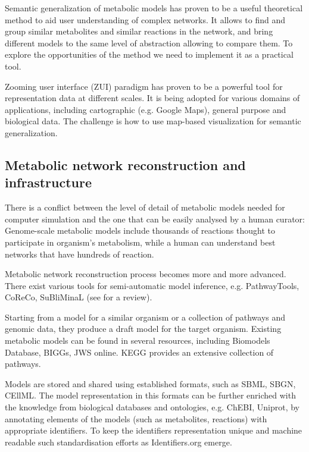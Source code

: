 \documentclass{bmcart}
\begin{document}
Semantic generalization of metabolic models\cite{Zhukova2014} has proven to be a useful theoretical method to aid user understanding of complex networks. It allows to find and group similar metabolites and similar reactions in the network, and bring different models to the same level of abstraction allowing to compare them. 
To explore the opportunities of the method we need to implement it as a practical tool.

Zooming user interface (ZUI)\cite{Bederson1998} paradigm has proven to be a powerful tool for representation data at different scales. It is being adopted for various domains of applications, including cartographic (e.g. Google Maps), general purpose and biological data. The challenge is how to use map-based visualization for semantic generalization.

\subsection*{Metabolic network reconstruction and infrastructure}
There is a conflict between the level of detail of metabolic models needed for computer simulation and the one that can be easily analysed by a human curator: Genome-scale metabolic models include thousands of reactions thought to participate in organism's metabolism, while a human can understand best networks that have hundreds of reaction.

Metabolic network reconstruction process becomes more and more advanced. There exist various tools for semi-automatic model inference, e.g. PathwayTools\cite{Karp2002}, CoReCo\cite{Pitkanen2014}, SuBliMinaL\cite{Swainston2011} (see \cite{Hamilton2014} for a review).

Starting from a model for a similar organism or a collection of pathways and genomic data, they produce a draft model for the target organism. Existing metabolic models can be found in several resources, including Biomodels Database\cite{Li10}, BIGGs\cite{Schellenberger2010}, JWS online\cite{Snoep2003}. KEGG\cite{Kanehisa12} provides an extensive collection of pathways. 

Models are stored and shared using established formats, such as SBML\cite{Hucka2003}, SBGN\cite{Moodie2011}, CEllML\cite{Lloyd2004}. The model representation in this formats can be further enriched with the knowledge from biological databases and ontologies, e.g. ChEBI\cite{deMatos10}, Uniprot\cite{TheUniProtConsortium2013}, by annotating elements of the models (such as metabolites, reactions) with appropriate identifiers. To keep the identifiers representation unique and machine readable such standardisation efforts as Identifiers.org\cite{Juty2012} emerge.
\end{document}
